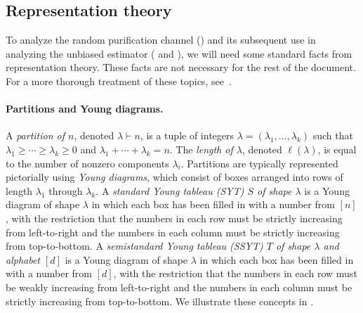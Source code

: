 \documentclass{article}
\begin{document}
\subsection{Representation theory}

To analyze the random purification channel () and its subsequent use in analyzing the unbiased estimator ( and ), we will need some standard facts from representation theory.
These facts are not necessary for the rest of the document.
For a more thorough treatment of these topics, see~\cite{Wri16}.

\paragraph{Partitions and Young diagrams.}
A \emph{partition of $n$}, denoted $\lambda \vdash n$, is a tuple of integers $\lambda  = (\lambda_1, \ldots, \lambda_k)$ such that $\lambda_1 \geq \cdots \geq \lambda_k \geq 0$ and $\lambda_1 + \cdots + \lambda_k = n$. The \emph{length of $\lambda$}, denoted $\ell(\lambda)$, is equal to the number of nonzero components $\lambda_i$.
Partitions are typically represented pictorially using \emph{Young diagrams}, which consist of boxes arranged into rows of length $\lambda_1$ through $\lambda_k$.
A \emph{standard Young tableau (SYT) $S$ of shape $\lambda$} is a Young diagram of shape $\lambda$ in which each box has been filled in with a number from $[n]$,
with the restriction that the numbers in each row must be strictly increasing from left-to-right
and the numbers in each column must be strictly increasing from top-to-bottom.
A \emph{semistandard Young tableau (SSYT) $T$ of shape $\lambda$ and alphabet $[d]$} is a Young diagram of shape $\lambda$ in which each box has been filled in with a number from $[d]$,
with the restriction that the numbers in each row must be weakly increasing from left-to-right
and the numbers in each column must be strictly increasing from top-to-bottom.
We illustrate these concepts in .
\end{document}
